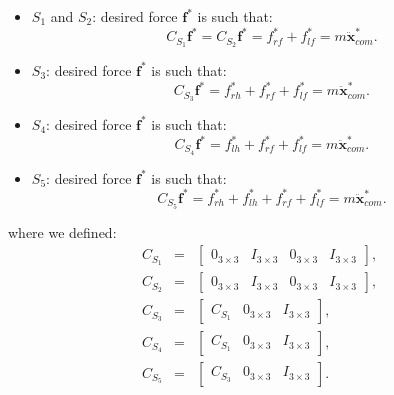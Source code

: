 \documentclass[12pt,a4paper,twoside]{article}
\begin{document}
\begin{itemize}
\item $S_1$ and $S_2$: desired force $\bm f^*$ is such that: 
\begin{equation} C_{S_1} \bm f^* = C_{S_2} \bm f^* = {f}^*_{rf} + {f}^*_{lf} = m \ddot {\bm x}^*_{com}. \label{eq:constraintsS1}\end{equation}
\item $S_3$: desired force $\bm f^*$ is such that:
\begin{equation} C_{S_3} \bm f^* = {f}^*_{rh} + {f}^*_{rf} + {f}^*_{lf} = m \ddot {\bm x}^*_{com}. \label{eq:constraintsS3}\end{equation}
\item $S_4$: desired force $\bm f^*$ is such that: 
\begin{equation} C_{S_4} \bm f^* = {f}^*_{lh} + {f}^*_{rf} + {f}^*_{lf} = m \ddot {\bm x}^*_{com}. \label{eq:constraintsS4}\end{equation}
\item $S_5$: desired force $\bm f^*$ is such that: 
\begin{equation} C_{S_5} \bm f^* = {f}^*_{rh} + {f}^*_{lh} + {f}^*_{rf} + {f}^*_{lf} = m \ddot {\bm x}^*_{com}. \label{eq:constraintsS5}\end{equation}
\end{itemize}
where we defined:
\begin{eqnarray*}
C_{S_1} & = & \begin{bmatrix} 0_{3\times3} & I_{3\times3} & 0_{3\times3} & I_{3\times3} \end{bmatrix}, \\
C_{S_2} & = & \begin{bmatrix} 0_{3\times3} & I_{3\times3} & 0_{3\times3} & I_{3\times3} \end{bmatrix}, \\
C_{S_3} & = & \begin{bmatrix}  C_{S_1} & 0_{3\times3} & I_{3\times3}\end{bmatrix}, \\
C_{S_4} & = & \begin{bmatrix} C_{S_1} & 0_{3\times3} & I_{3\times3}\end{bmatrix}, \\
C_{S_5} & = & \begin{bmatrix} C_{S_3} & 0_{3\times3} & I_{3\times3}\end{bmatrix}. 
\end{eqnarray*}
\end{document}
